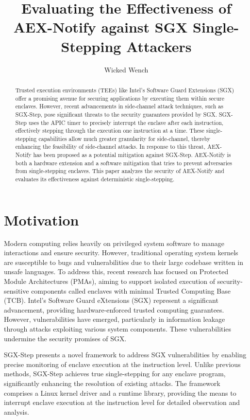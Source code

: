 \documentclass{llncs}
\title{Evaluating the Effectiveness of AEX-Notify against SGX Single-Stepping Attackers}
\author{Wicked Wench}
\institute{	University of L\"ubeck, Germany}
\begin{document}
\maketitle

\begin{abstract}
  Trusted execution environments (TEEs) like Intel's Software Guard Extensions (SGX)
  offer a promising avenue for securing applications by executing them within secure enclaves.
  However, recent advancements in side-channel attack techniques, such as SGX-Step,
  pose significant threats to the security guarantees provided by SGX.
  SGX-Step uses the APIC timer to precisely interrupt the enclave after each instruction,
  effectively stepping through the execution one instruction at a time.
  These single-stepping capabilities allow much greater granularity for side-channel,
  thereby enhancing the feasibility of side-channel attacks.
  In response to this threat, AEX-Notify has been proposed as a potential mitigation against SGX-Step.
  AEX-Notify is both a hardware extension and a software mitigation that tries
  to prevent adversaries from single-stepping enclaves.
  This paper analyzes the security of AEX-Notify and evaluates its
  effectiveness against deterministic single-stepping.
\end{abstract}

\section{Motivation}

Modern computing relies heavily on privileged system software to manage interactions and ensure security.
However, traditional operating system kernels are susceptible to bugs and vulnerabilities
due to their large codebase written in unsafe languages.
To address this, recent research has focused on Protected Module Architectures (PMAs),
aiming to support isolated execution of security-sensitive components
called enclaves with minimal Trusted Computing Base (TCB).
Intel’s Software Guard eXtensions (SGX) \cite{Intel16,Intel17} represent a significant advancement,
providing hardware-enforced trusted computing guarantees.
However, vulnerabilities have emerged, particularly in information leakage
through attacks exploiting various system components.
These vulnerabilities undermine the security promises of SGX.

SGX-Step presents a novel framework to address SGX vulnerabilities by enabling
precise monitoring of enclave execution at the instruction level.
Unlike previous methods, SGX-Step achieves true single-stepping for any enclave program,
significantly enhancing the resolution of existing attacks.
The framework comprises a Linux kernel driver and a runtime library,
providing the means to interrupt enclave execution at the instruction level
for detailed observation and analysis.
\end{document}
